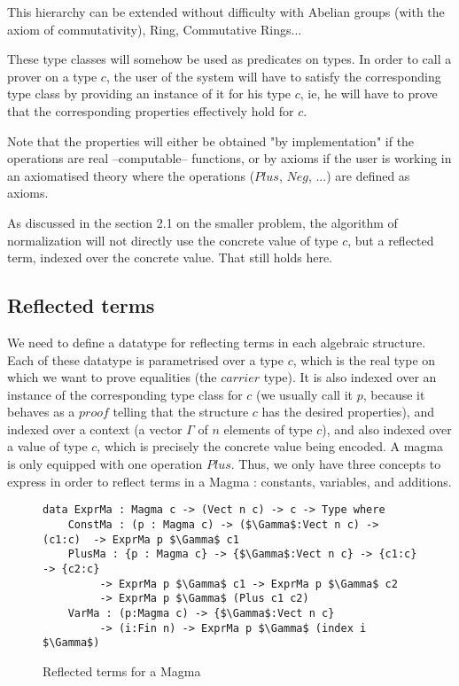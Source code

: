 This hierarchy can be extended without difficulty with Abelian groups (with the axiom of commutativity), Ring, Commutative Rings...

These type classes will somehow be used as predicates on types. In order to call a prover on a type $c$, the user of the system will have to satisfy the corresponding type class by providing an instance of it for his type $c$, ie, he will have to prove that the corresponding properties effectively hold for $c$.

Note that the properties will either be obtained "by implementation" if the operations are real --computable-- functions, or by axioms if the user is working in an axiomatised theory where the operations ($Plus$, $Neg$, ...) are defined as axioms.

As discussed in the section 2.1 on the smaller problem, the algorithm of normalization will not directly use the concrete value of type $c$, but a reflected term, indexed over the concrete value. That still holds here.


	\subsection {Reflected terms}

We need to define a datatype for reflecting terms in each algebraic structure.
Each of these datatype is parametrised over a type $c$, which is the real type on which we want to prove equalities (the $carrier$ type). It is also indexed over an instance of the corresponding type class for $c$ (we usually call it $p$, because it behaves as a $proof$ telling that the structure $c$ has the desired properties), and indexed over a context (a vector $\Gamma$ of $n$ elements of type $c$), and also indexed over a value of type $c$, which is precisely the concrete value being encoded.
A magma is only equipped with one operation $Plus$. Thus, we only have three concepts to express in order to reflect terms in a Magma : constants, variables, and additions.



\begin{figure}[H]
\figrule
\begin{center}
\begin{lstlisting}
data ExprMa : Magma c -> (Vect n c) -> c -> Type where
    ConstMa : (p : Magma c) -> ($\Gamma$:Vect n c) -> (c1:c)  -> ExprMa p $\Gamma$ c1 
    PlusMa : {p : Magma c} -> {$\Gamma$:Vect n c} -> {c1:c} -> {c2:c} 
         -> ExprMa p $\Gamma$ c1 -> ExprMa p $\Gamma$ c2 
         -> ExprMa p $\Gamma$ (Plus c1 c2) 
    VarMa : (p:Magma c) -> {$\Gamma$:Vect n c}
         -> (i:Fin n) -> ExprMa p $\Gamma$ (index i $\Gamma$)
\end{lstlisting}
\end{center}
\caption{Reflected terms for a Magma}
\figrule
\end{figure}

